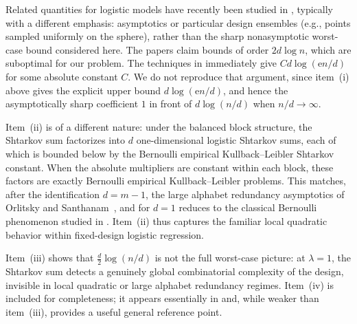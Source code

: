 \documentclass[11pt, letterpaper, hidelinks]{article}
\newcommand{\e}{\mathrm{e}}
\newcommand{\1}{\mathbf 1}
\theoremstyle{plain}
\theoremstyle{definition}
\begin{document}
Related quantities for logistic models have recently been studied in \cite{ShamirSzpankowski2021,JacquetShamirSzpankowski2022,DrmotaJacquetWuSzpankowski2024,drmota2025precise,DrmotaJacquetWuSzpankowski2026,QianRakhlinZhivotovskiy2026}, typically with a different emphasis: asymptotics or particular design ensembles (e.g., points sampled uniformly on the sphere), rather than the sharp nonasymptotic worst-case bound considered here. The papers \cite{DrmotaJacquetWuSzpankowski2024,DrmotaJacquetWuSzpankowski2026} claim bounds of order $2d\log n$, which are suboptimal for our problem. The techniques in \cite[Appendix~D]{QianRakhlinZhivotovskiy2026} immediately give $Cd\log(\e n/d)$ for some absolute constant $C$. We do not reproduce that argument, since item~(i) above gives the explicit upper bound $d\log(\e n/d)$, and hence the asymptotically sharp coefficient $1$ in front of $d\log(n/d)$ when $n/d\to\infty$.

Item~(ii) is of a different nature: under the balanced block structure, the Shtarkov sum factorizes into \(d\) one-dimensional logistic Shtarkov sums, each of which is bounded below by the Bernoulli empirical Kullback--Leibler Shtarkov constant. When the absolute multipliers are constant within each block, these factors are exactly Bernoulli empirical Kullback--Leibler problems. This matches, after the identification \(d=m-1\), the large alphabet redundancy asymptotics of Orlitsky and Santhanam~\cite{orlitsky2004speaking}, and for \(d=1\) reduces to the classical Bernoulli phenomenon studied in \cite{maurer2004note, agrawal2020finite, guo2020chernoff}. Item~(ii) thus captures the familiar local quadratic behavior within fixed-design logistic regression.

Item~(iii) shows that \(\tfrac{d}{2}\log(n/d)\) is not the full worst-case picture: at \(\lambda=1\), the Shtarkov sum detects a genuinely global combinatorial complexity of the design, invisible in local quadratic or large alphabet redundancy regimes. Item~(iv) is included for completeness; it appears essentially in \cite{DrmotaJacquetWuSzpankowski2024} and, while weaker than item~(iii), provides a useful general reference point.
\end{document}

